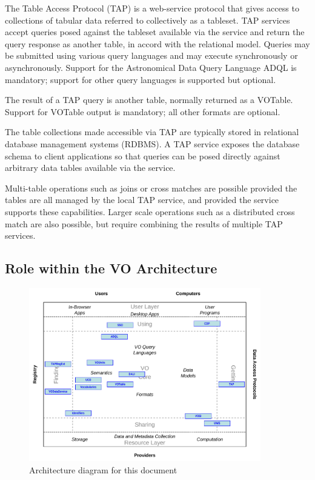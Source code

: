 \documentclass[11pt,letter]{ivoa}
\begin{document}
The Table Access Protocol (TAP) is a web-service protocol that gives access to 
collections of tabular data referred to collectively as a tableset.  TAP 
services accept queries posed against the tableset available via the service and 
return the query response as another table, in accord with the relational model. 
 Queries may be submitted using various query languages and may execute 
synchronously or asynchronously. Support for the Astronomical Data Query 
Language ADQL \citep{2008ivoa.spec.1030O} is mandatory; support for other query languages is 
supported 
but optional.

The result of a TAP query is another table, normally returned as a VOTable. 
Support for VOTable output is mandatory; all other formats are optional.

The table collections made accessible via TAP are typically stored in relational 
database management systems (RDBMS). A TAP service exposes the database schema 
to client applications so that queries can be posed directly against arbitrary 
data tables available via the service.

Multi-table operations such as joins or cross matches are possible provided the 
tables are all managed by the local TAP service, and provided the service 
supports these capabilities.  Larger scale operations such as a distributed 
cross match are also possible, but require combining the results of multiple TAP 
services.

\subsection{Role within the VO Architecture}
\label{sec:Role}


\begin{figure}
\centering


\includegraphics[width=0.9\textwidth]{role_diagram.pdf}
\caption{Architecture diagram for this document}
\label{fig:archdiag}
\end{figure}
\end{document}
